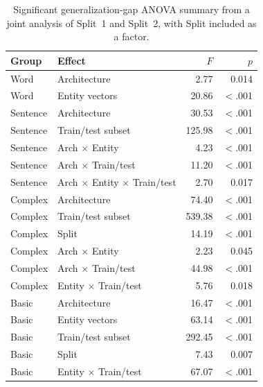 \begin{table}[t]
\centering\scriptsize
\begin{tabular}{@{}llrr@{}}
\toprule
\textbf{Group} & \textbf{Effect} & $F$ & $p$ \\
\midrule
Word & Architecture & 2.77 & 0.014 \\
Word & Entity vectors & 20.86 & $<$.001 \\
Sentence & Architecture & 30.53 & $<$.001 \\
Sentence & Train/test subset & 125.98 & $<$.001 \\
Sentence & Arch $\times$ Entity & 4.23 & $<$.001 \\
Sentence & Arch $\times$ Train/test & 11.20 & $<$.001 \\
Sentence & Arch $\times$ Entity $\times$ Train/test & 2.70 & 0.017 \\
Complex & Architecture & 74.40 & $<$.001 \\
Complex & Train/test subset & 539.38 & $<$.001 \\
Complex & Split & 14.19 & $<$.001 \\
Complex & Arch $\times$ Entity & 2.23 & 0.045 \\
Complex & Arch $\times$ Train/test & 44.98 & $<$.001 \\
Complex & Entity $\times$ Train/test & 5.76 & 0.018 \\
Basic & Architecture & 16.47 & $<$.001 \\
Basic & Entity vectors & 63.14 & $<$.001 \\
Basic & Train/test subset & 292.45 & $<$.001 \\
Basic & Split & 7.43 & 0.007 \\
Basic & Entity $\times$ Train/test & 67.07 & $<$.001 \\
\bottomrule
\end{tabular}
\caption{\small Significant generalization-gap ANOVA summary from a joint analysis of Split~1 and Split~2, with Split included as a factor.}
\label{tab:gap_significant_anova}
\end{table}
